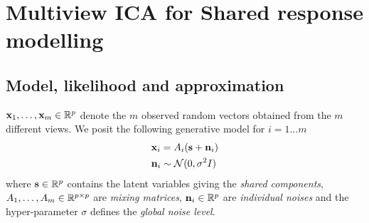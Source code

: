 \documentclass{report}
\begin{document}

%
%
%
%
%
\section{Multiview ICA for Shared response modelling}
\label{sec:mvica}
\subsection{Model, likelihood and approximation}
$\mathbf{x}_1, \dots ,\mathbf{x}_m \in \mathbb{R}^p$ denote the $m$ observed random vectors obtained from the $m$ different views. We posit the following generative model for $i= 1\dots m$
\begin{align}
   &\mathbf{x}_i = A_i(\mathbf{s} + \mathbf{n}_i) \\
   & \mathbf{n}_i \sim\mathcal{N}(0, \sigma^2 I) \label{eq:mvica:model} 
\end{align}
where $\mathbf{s} \in \mathbb{R}^{p}$ contains the latent variables giving the \emph{shared components}, $A_1,\dots, A_m\in\mathbb{R}^{p\times p}$ are \emph{mixing matrices}, $\mathbf{n}_i \in
\mathbb{R}^{p}$ are \emph{individual noises} and the hyper-parameter $\sigma$ defines the
\emph{global noise level}.
\end{document}
